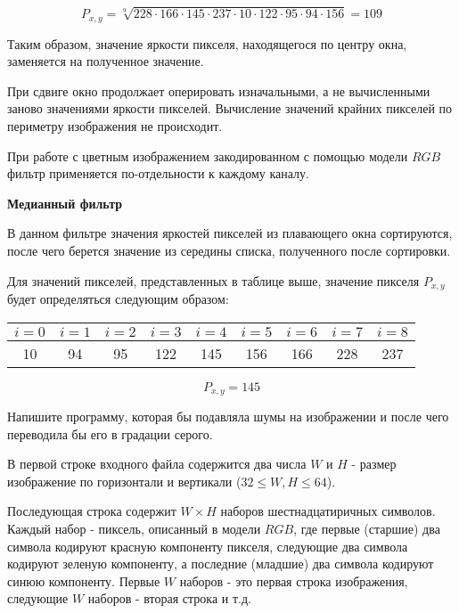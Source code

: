 $$P_{x,y} = \sqrt[9]{228\cdot166\cdot145\cdot237\cdot10\cdot122\cdot95\cdot94\cdot156} = 109$$

Таким образом, значение яркости пикселя, находящегося по центру окна, заменяется на полученное значение.

При сдвиге окно продолжает оперировать изначальными, а не вычисленными заново значениями яркости пикселей. Вычисление значений крайних пикселей по периметру изображения не происходит.

При работе с цветным изображением закодированном с помощью модели $RGB$ фильтр применяется по-отдельности к каждому каналу.

\textbf{Медианный фильтр}

В данном фильтре значения яркостей пикселей из плавающего окна сортируются, после чего берется значение из середины списка, полученного после сортировки.

Для значений пикселей, представленных в таблице выше, значение пикселя $P_{x,y}$ будет определяться следующим образом:

\begin{table}[h!]
\centering
\begin{tabular}{ccccccccc}
\rowcolor[HTML]{EFEFEF} 
$i=0$                    & $i=1$                   & $i=2$                   & $i=3$                    & $i=4$                                            & $i=5$                    & $i=6$                    & $i=7$                    & $i=8$                    \\ \hline
\multicolumn{1}{|c|}{10} & \multicolumn{1}{c|}{94} & \multicolumn{1}{c|}{95} & \multicolumn{1}{c|}{122} & \multicolumn{1}{c|}{\cellcolor[HTML]{FFCE93}145} & \multicolumn{1}{c|}{156} & \multicolumn{1}{c|}{166} & \multicolumn{1}{c|}{228} & \multicolumn{1}{c|}{237} \\ \hline
\end{tabular}
\end{table}

$$P_{x,y} = 145$$

Напишите программу, которая бы подавляла шумы на изображении и после чего переводила бы его в градации серого.


В первой строке входного файла содержится два числа $W$ и $H$ - размер изображение по горизонтали и вертикали ($32 \le W, H \le 64$).

Последующая строка содержит $W \times H$ наборов шестнадцатиричных символов. Каждый набор - пиксель, описанный в модели $RGB$, где первые (старшие) два символа кодируют красную компоненту пикселя, следующие два символа кодируют зеленую компоненту, а последние (младшие) два символа кодируют синюю компоненту.
Первые $W$ наборов - это первая строка изображения, следующие $W$ наборов - вторая строка и т.д.

